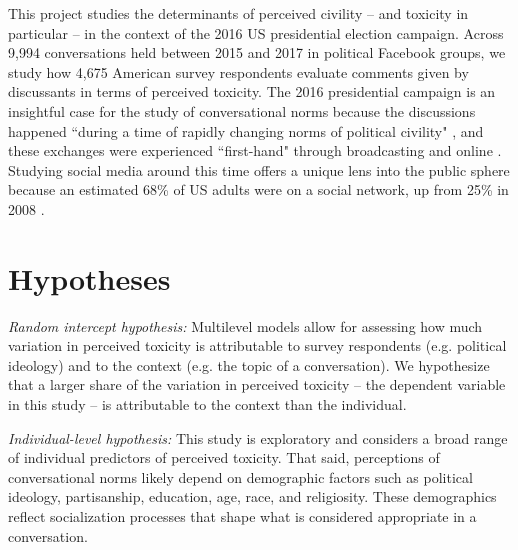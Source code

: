 \documentclass{article}
\begin{document}
This project studies the determinants of perceived civility -- and toxicity in particular -- in the context of the 2016 US presidential election campaign. Across 9,994 conversations held between 2015 and 2017 in political Facebook groups, we study how 4,675 American survey respondents evaluate comments given by discussants in terms of perceived toxicity. The 2016 presidential campaign is an insightful case for the study of conversational norms because the discussions happened ``during a time of rapidly changing norms of political civility" \citep{munger_dont_2021}, and these exchanges were experienced ``first-hand" through broadcasting and online \citep{mutz_inyourface_2016}. Studying social media around this time offers a unique lens into the public sphere because an estimated 68\% of US adults were on a social network, up from 25\% in 2008 \citep{duggan_social_2016}.


\section{Hypotheses}

\textit{Random intercept hypothesis:} Multilevel models allow for assessing how much variation in perceived toxicity is attributable to survey respondents (e.g. political ideology) and to the context (e.g. the topic of a conversation). We hypothesize that a larger share of the variation in perceived toxicity -- the dependent variable in this study -- is attributable to the context than the individual.

\textit{Individual-level hypothesis:} This study is exploratory and considers a broad range of individual predictors of perceived toxicity. That said, perceptions of conversational norms likely depend on demographic factors such as political ideology, partisanship, education, age, race, and religiosity. These demographics reflect socialization processes that shape what is considered appropriate in a conversation. 
\end{document}
